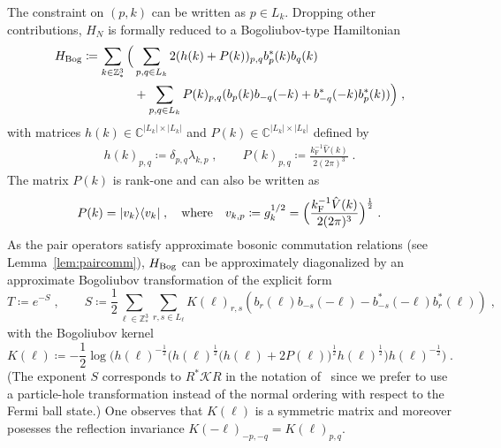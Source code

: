 \documentclass[12pt,a4paper]{article}
\numberwithin{equation}{section}
\newcommand{\cK}{\mathcal{K}}
\newcommand{\CCC}{\mathbb{C}}
\newcommand{\ZZZ}{\mathbb{Z}}
\newcommand{\1}{\mathbb{I}}
\newcommand{\Bog}{\textnormal{Bog}}
\newcommand{\F}{\mathrm{F}}
\newcommand{\half}{\frac{1}{2}}
\theoremstyle{plain}
\theoremstyle{definition}
\theoremstyle{remark}
\theoremstyle{plain}
\theoremstyle{definition}
\theoremstyle{remark}
\begin{document}
The constraint on $ (p,k) $ can be written as $ p \in L_k $.
Dropping other contributions, $ H_N $ is formally reduced to a Bogoliubov-type Hamiltonian~\cite[(1.34)]{CHN23}
\begin{equation} \label{eq:HBog}
\begin{split}
	H_{\Bog}
	\coloneq \sum_{k \in \ZZZ^3_*} \Big( & \sum_{p,q \in L_k} 2 (h(k) + P(k))_{p,q} b^*_p(k) b_q(k) \\
	& 		+ \sum_{p,q \in L_k} P(k)_{p,q} (b_p(k) b_{-q}(-k) + b^*_{-q}(-k) b^*_p(k)) \Big) \;,
\end{split}
\end{equation}
with matrices $ h(k) \in \CCC^{|L_k| \times |L_k|}$ and $P(k) \in \CCC^{|L_k| \times |L_k|} $ defined by
\begin{equation} \label{eq:HkPk}
\begin{aligned}
	h(k)_{p,q} \coloneq \delta_{p,q} \lambda_{k,p} \;, \qquad
	P(k)_{p,q} \coloneq \frac{k_{\F}^{-1}\hat{V}(k) }{2 (2 \pi)^3} \;.
\end{aligned}
\end{equation}
The matrix $ P(k) $ is rank-one and can also be written as
\begin{equation}P(k) = \lvert v_k \rangle \langle v_k \rvert \;, \quad \textnormal{where} \quad v_{k,p} \coloneq g_k^{1/2} = \Big( \frac{k_{\F}^{-1} \hat{V}(k) }{2 (2 \pi)^3} \Big)^\half \;.
\end{equation}
 As the pair operators satisfy approximate bosonic commutation relations (see Lemma~\ref{lem:paircomm}), $ H_{\Bog} $ can be approximately diagonalized by an approximate Bogoliubov transformation \cite[Thm.~1.4]{CHN23} of the explicit form
\begin{equation} \label{eq:T}
	T \coloneq e^{-S} \;, \qquad
	S \coloneq \frac{1}{2}\sum_{\ell\in \mathbb{Z}^3_*}\sum_{r,s\in L_\ell}K(\ell)_{r,s}\left(b_r(\ell)b_{-s}(-\ell)-b^*_{-s}(-\ell)b^*_{r}(\ell)\right) \;,
\end{equation}
with the Bogoliubov kernel
\begin{equation} \label{eq:K}
	K(\ell) \coloneq - \half \log \Big( h(\ell)^{-\half}
		\big( h(\ell)^{\half} \big( h(\ell) + 2 P(\ell) \big)^{\half} h(\ell)^{\half}\big)
		h(\ell)^{-\half} \Big) \;.
\end{equation}
(The exponent $ S $ corresponds to $ R^* \cK R $ in the notation of~\cite{CHN23} since we prefer to use a particle-hole transformation instead of the normal ordering with respect to the Fermi ball state.)
One observes that $K(\ell)$ is a symmetric matrix and moreover posesses the reflection invariance $ K(-\ell)_{-p,-q} = K(\ell)_{p,q} $.
\end{document}
